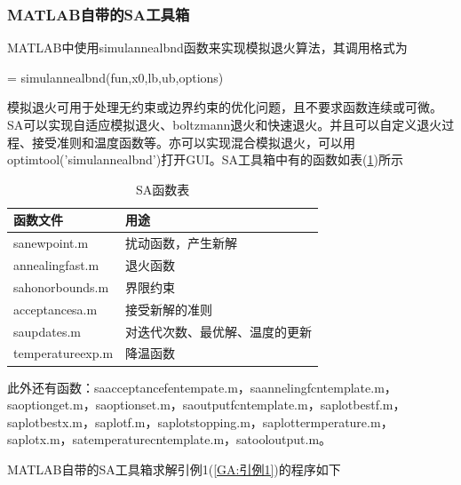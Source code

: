         \subsubsection{MATLAB自带的SA工具箱}
            \par
            MATLAB中使用simulannealbnd函数来实现模拟退火算法，其调用格式为
            \par
            [x,fval,exitflag,output] = simulannealbnd(fun,x0,lb,ub,options)
            \par
            模拟退火可用于处理无约束或边界约束的优化问题，且不要求函数连续或可微。SA可以实现自适应模拟退火、boltzmann退火和快速退火。并且可以自定义退火过程、接受准则和温度函数等。亦可以实现混合模拟退火，可以用optimtool('simulannealbnd')打开GUI。SA工具箱中有的函数如表(\ref{SA函数表})所示
            \begin{table}[H]
                \caption{SA函数表}
                \label{SA函数表}
                \centering
                \begin{tabular}{l|l}
                \toprule
                函数文件   & 用途 \\
                \midrule
                sanewpoint.m      & 扰动函数，产生新解 \\
                annealingfast.m      & 退火函数 \\
                sahonorbounds.m      & 界限约束 \\
                acceptancesa.m &接受新解的准则 \\
                saupdates.m      & 对迭代次数、最优解、温度的更新 \\
                temperatureexp.m      & 降温函数 \\
                \bottomrule
                \end{tabular}
            \end{table}
            \par
            此外还有函数：saacceptancefentempate.m，saannelingfcntemplate.m，saoptionget.m，saoptionset.m，saoutputfcntemplate.m，saplotbestf.m，saplotbestx.m，saplotf.m，saplotstopping.m，saplottermperature.m，saplotx.m，satemperaturecntemplate.m，satooloutput.m。
            \par
            MATLAB自带的SA工具箱求解引例1(\ref{GA:引例1})的程序如下

